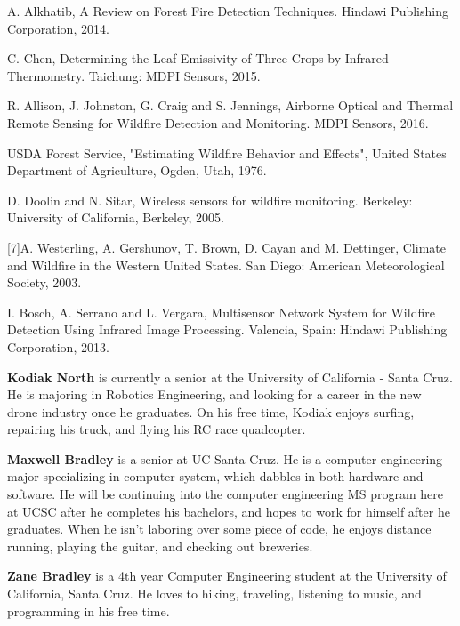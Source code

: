 \documentclass[12pt,journal,compsoc]{IEEEtran}
\begin{document}
\begin{thebibliography}{2}
A. Alkhatib, A Review on Forest Fire Detection Techniques. Hindawi Publishing Corporation, 2014.

C. Chen, Determining the Leaf Emissivity of Three Crops by Infrared Thermometry. Taichung: MDPI Sensors, 2015.

R. Allison, J. Johnston, G. Craig and S. Jennings, Airborne Optical and Thermal Remote Sensing for Wildfire Detection and Monitoring. MDPI Sensors, 2016.

USDA Forest Service, "Estimating Wildfire Behavior and Effects", United States Department of Agriculture, Ogden, Utah, 1976.

D. Doolin and N. Sitar, Wireless sensors for wildfire monitoring. Berkeley: University of California, Berkeley, 2005.

[7]A. Westerling, A. Gershunov, T. Brown, D. Cayan and M. Dettinger, Climate and Wildfire in the Western United States. San Diego: American Meteorological Society, 2003.

I. Bosch, A. Serrano and L. Vergara, Multisensor Network System for Wildfire Detection Using Infrared Image Processing. Valencia, Spain: Hindawi Publishing Corporation, 2013.
\end{thebibliography}

\vspace{1cm}

\textbf{Kodiak North}
is currently a senior at the University of California - Santa Cruz. He is majoring in Robotics Engineering, and looking for a career in the new drone industry once he graduates. On his free time, Kodiak enjoys surfing, repairing his truck, and flying his RC race quadcopter.

\textbf{Maxwell Bradley}
is a senior at UC Santa Cruz. He is a computer engineering major specializing in computer system, which dabbles in both hardware and software. He will be continuing into the computer engineering MS program here at UCSC after he completes his bachelors, and hopes to work for himself after he graduates. When he isn't laboring over some piece of code, he enjoys distance running, playing the guitar, and checking out breweries.

\textbf{Zane Bradley}
is a 4th year Computer Engineering student at the University of California, Santa Cruz. He loves to hiking, traveling, listening to music, and programming in his free time.
\end{document}
